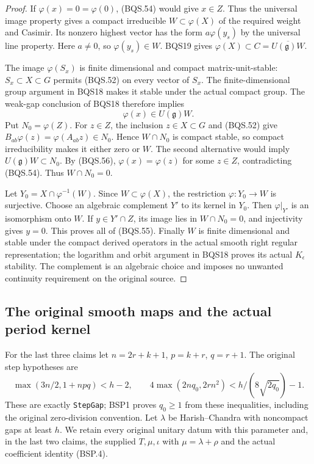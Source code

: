 \documentclass[11pt,a4paper]{article}
\numberwithin{equation}{section}
\theoremstyle{remark}\newtheorem{remark}[theorem]{Remark}
\begin{document}
\begin{proof}
If $\varphi(x)=0=\varphi(0)$, (BQS.54) would give $x\in Z$.
Thus the universal image property gives a compact irreducible
$W\subset\varphi(X)$ of the required weight and Casimir.
Its nonzero highest vector has the form $a\varphi(y_s)$ by the
universal line property.  Here $a\ne0$, so $\varphi(y_s)\in W$.
BQS19 gives $\varphi(X)\subset C=\overline{U(\mathfrak g)W}$.

The image $\varphi(S_x)$ is finite dimensional and compact
matrix-unit-stable: $S_x\subset X\subset G$ permits (BQS.52)
on every vector of $S_x$.  The finite-dimensional group
argument in BQS18 makes it stable under the actual compact
group.  The weak-gap conclusion of BQS18 therefore implies
\[
                       \varphi(x)\in U(\mathfrak g)W.
 \tag{BQS.56}
\]
Put $N_0=\varphi(Z)$.  For $z\in Z$, the inclusion
$z\in X\subset G$ and (BQS.52) give
$B_{ab}\varphi(z)=\varphi(A_{ab}z)\in N_0$.
Hence $W\cap N_0$ is compact stable, so compact irreducibility
makes it either zero or $W$.
The second alternative would imply
$U(\mathfrak g)W\subset N_0$.
By (BQS.56), $\varphi(x)=\varphi(z)$ for some $z\in Z$,
contradicting (BQS.54).  Thus $W\cap N_0=0$.

Let $Y_0=X\cap\varphi^{-1}(W)$.
Since $W\subset\varphi(X)$, the restriction
$\varphi:Y_0\to W$ is surjective.
Choose an algebraic complement $Y'$ to its kernel in $Y_0$.
Then $\varphi|_{Y'}$ is an isomorphism onto $W$.
If $y\in Y'\cap Z$, its image lies in $W\cap N_0=0$,
and injectivity gives $y=0$.
This proves all of (BQS.55).  Finally $W$ is finite dimensional
and stable under the compact derived operators in the actual
smooth right regular representation; the logarithm and orbit
argument in BQS18 proves its actual $K_\epsilon$ stability.
The complement is an algebraic choice and imposes no unwanted
continuity requirement on the original source.
\end{proof}

\subsection{The original smooth maps and the actual period kernel}

For the last three claims let $n=2r+k+1$, $p=k+r$, $q=r+1$.
The original step hypotheses are
\[
 \max(3n/2,1+npq)<h-2,\qquad
 4\max(2nq_0,2rn^2)<h/(8\sqrt{2q_0})-1.
 \tag{BQS.57}
\]
These are exactly \texttt{Step\allowbreak Gap}; BSP1 proves $q_0\ge1$
from these inequalities, including the original zero-division convention.
Let $\lambda$ be Harish--Chandra with noncompact gaps at least $h$.
We retain every original unitary datum with this parameter and, in the
last two claims, the supplied $T,\mu,\iota$ with
$\mu=\lambda+\rho$ and the actual coefficient identity (BSP.4).
\end{document}
